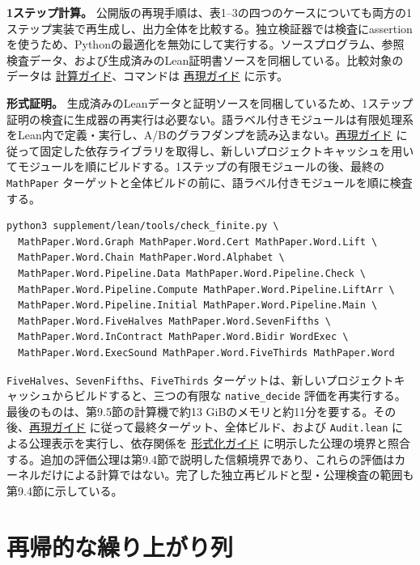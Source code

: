 \documentclass[11pt,reqno]{amsart}
\theoremstyle{definition}
\theoremstyle{definition}
\theoremstyle{remark}
\begin{document}
\textbf{1ステップ計算。} 公開版の再現手順は、表1--3の四つのケースについても両方の1ステップ実装で再生成し、出力全体を比較する。独立検証器では検査にassertionを使うため、Pythonの最適化を無効にして実行する。ソースプログラム、参照検査データ、および生成済みのLean証明書ソースを同梱している。比較対象のデータは \href{supplement/COMPUTATION.md}{計算ガイド}、コマンドは \href{REPRODUCE.md}{再現ガイド} に示す。

\textbf{形式証明。} 生成済みのLeanデータと証明ソースを同梱しているため、1ステップ証明の検査に生成器の再実行は必要ない。語ラベル付きモジュールは有限処理系をLean内で定義・実行し、A/Bのグラフダンプを読み込まない。\href{REPRODUCE.md}{再現ガイド} に従って固定した依存ライブラリを取得し、新しいプロジェクトキャッシュを用いてモジュールを順にビルドする。1ステップの有限モジュールの後、最終の \nolinkurl{MathPaper} ターゲットと全体ビルドの前に、語ラベル付きモジュールを順に検査する。

\begin{Verbatim}[fontsize=\small,breaklines=true,breakanywhere=true]
python3 supplement/lean/tools/check_finite.py \
  MathPaper.Word.Graph MathPaper.Word.Cert MathPaper.Word.Lift \
  MathPaper.Word.Chain MathPaper.Word.Alphabet \
  MathPaper.Word.Pipeline.Data MathPaper.Word.Pipeline.Check \
  MathPaper.Word.Pipeline.Compute MathPaper.Word.Pipeline.LiftArr \
  MathPaper.Word.Pipeline.Initial MathPaper.Word.Pipeline.Main \
  MathPaper.Word.FiveHalves MathPaper.Word.SevenFifths \
  MathPaper.Word.InContract MathPaper.Word.Bidir WordExec \
  MathPaper.Word.ExecSound MathPaper.Word.FiveThirds MathPaper.Word
\end{Verbatim}

\nolinkurl{FiveHalves}、\nolinkurl{SevenFifths}、\nolinkurl{FiveThirds} ターゲットは、新しいプロジェクトキャッシュからビルドすると、三つの有限な \nolinkurl{native_decide} 評価を再実行する。最後のものは、第9.5節の計算機で約13 GiBのメモリと約11分を要する。その後、\href{REPRODUCE.md}{再現ガイド} に従って最終ターゲット、全体ビルド、および \nolinkurl{Audit.lean} による公理表示を実行し、依存関係を \href{supplement/FORMALIZATION.md}{形式化ガイド} に明示した公理の境界と照合する。追加の評価公理は第9.4節で説明した信頼境界であり、これらの評価はカーネルだけによる計算ではない。完了した独立再ビルドと型・公理検査の範囲も第9.4節に示している。

\Needspace{6\baselineskip}\section{再帰的な繰り上がり列}\label{app:B}
\end{document}
